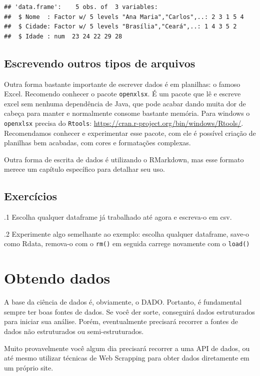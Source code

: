\documentclass[]{book}
\begin{document}
\begin{verbatim}
## 'data.frame':    5 obs. of  3 variables:
##  $ Nome  : Factor w/ 5 levels "Ana Maria","Carlos",..: 2 3 1 5 4
##  $ Cidade: Factor w/ 5 levels "Brasília","Ceará",..: 1 4 3 5 2
##  $ Idade : num  23 24 22 29 28
\end{verbatim}

\section{Escrevendo outros tipos de
arquivos}\label{escrevendo-outros-tipos-de-arquivos}

Outra forma bastante importante de escrever dados é em planilhas: o
famoso Excel. Recomendo conhecer o pacote \texttt{openxlsx}. É um pacote
que lê e escreve excel sem nenhuma dependência de Java, que pode acabar
dando muita dor de cabeça para manter e normalmente consome bastante
memória. Para windows o \texttt{openxlsx} precisa do \texttt{Rtools}:
\url{https://cran.r-project.org/bin/windows/Rtools/}. Recomendamos
conhecer e experimentar esse pacote, com ele é possível criação de
planilhas bem acabadas, com cores e formatações complexas.

Outra forma de escrita de dados é utilizando o RMarkdown, mas esse
formato merece um capítulo específico para detalhar seu uso.

\section{Exercícios}\label{exercicios-6}

.1 Escolha qualquer dataframe já trabalhado até agora e escreva-o em
csv.

.2 Experimente algo semelhante ao exemplo: escolha qualquer dataframe,
save-o como Rdata, remova-o com o \texttt{rm()} em seguida carrege
novamente com o \texttt{load()}

\chapter{Obtendo dados}\label{obtendo-dados}

A base da ciência de dados é, obviamente, o DADO. Portanto, é
fundamental sempre ter boas fontes de dados. Se você der sorte,
conseguirá dados estruturados para iniciar sua análise. Porém,
eventualmente precisará recorrer a fontes de dados não estruturados ou
semi-estruturados.

Muito provavelmente você algum dia precisará recorrer a uma API de
dados, ou até mesmo utilizar técnicas de Web Scrapping para obter dados
diretamente em um próprio site.
\end{document}
